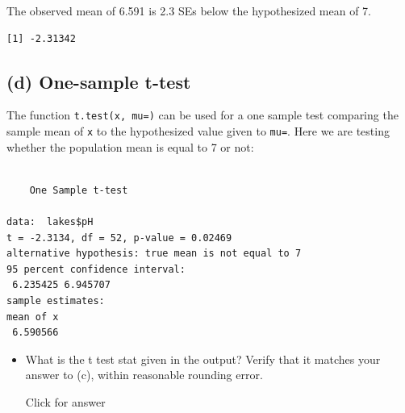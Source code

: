 \documentclass[
]{book}
\newenvironment{Shaded}{\begin{snugshade}}{\end{snugshade}}
\newcommand{\AttributeTok}[1]{\textcolor[rgb]{0.77,0.63,0.00}{#1}}
\newcommand{\DecValTok}[1]{\textcolor[rgb]{0.00,0.00,0.81}{#1}}
\newcommand{\FunctionTok}[1]{\textcolor[rgb]{0.00,0.00,0.00}{#1}}
\newcommand{\NormalTok}[1]{#1}
\newcommand{\SpecialCharTok}[1]{\textcolor[rgb]{0.00,0.00,0.00}{#1}}
\providecommand{\tightlist}{%
  \setlength{\itemsep}{0pt}\setlength{\parskip}{0pt}}
\begin{document}
The observed mean of 6.591 is 2.3 SEs below the hypothesized mean of 7.

\begin{Shaded}
\end{Shaded}

\begin{verbatim}
[1] -2.31342
\end{verbatim}

\hypertarget{d-one-sample-t-test}{%
\subsection{(d) One-sample t-test}\label{d-one-sample-t-test}}

The function \texttt{t.test(x,\ mu=)} can be used for a one sample test comparing the sample mean of \texttt{x} to the hypothesized value given to \texttt{mu=}. Here we are testing whether the population mean is equal to 7 or not:

\begin{Shaded}
\end{Shaded}

\begin{verbatim}

    One Sample t-test

data:  lakes$pH
t = -2.3134, df = 52, p-value = 0.02469
alternative hypothesis: true mean is not equal to 7
95 percent confidence interval:
 6.235425 6.945707
sample estimates:
mean of x 
 6.590566 
\end{verbatim}

\begin{itemize}
\tightlist
\item
  What is the t test stat given in the output? Verify that it matches your answer to (c), within reasonable rounding error.

  Click for answer
\end{itemize}
\end{document}

